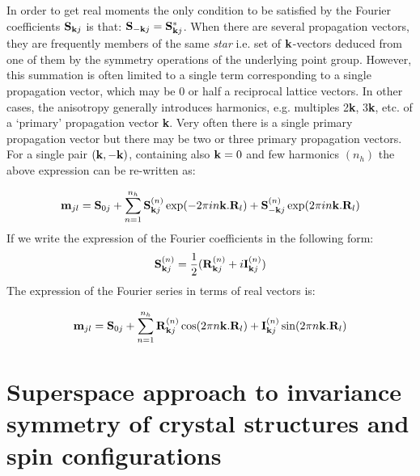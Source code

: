 \documentclass[10pt]{article}
\begin{document}
In order to get real moments the only condition to be satisfied by the Fourier coefficients ${\bf S}_{{\bf k}j}$ is that: ${\bf S}_{-{\bf k}j} = {\bf S}_{{\bf k}j}^*$.
When there are several propagation vectors, they are frequently members of the same {\it star} i.e. set of ${\bf k}$-vectors deduced from one of them by the symmetry operations of the underlying point group. However, this summation is often limited to a single term corresponding to a single propagation vector, which may be 0 or half a reciprocal lattice vectors. In other cases, the anisotropy generally introduces harmonics, e.g. multiples 2{\bf k}, 3{\bf k}, etc. of a `primary' propagation vector  {\bf k}. Very often there is a single primary propagation vector but there may be two or three primary propagation vectors. For a single pair $({\bf k}, -{\bf k})$, containing also $ {\bf k}=0 $ and few harmonics ${(n_h)}$ the above expression can be re-written as:

\begin{equation}
\label{eq_fourier_b}
{\bf m}_{jl} = {\bf S}_{0j} +  \sum\limits_{n=1}^{n_h} {\bf S}_{{\bf k}j}^{(n)} \exp(- 2\pi i n{\bf k}. {\bf R}_l)+ {\bf S}_{-{\bf k}j}^{(n)} \exp(2\pi i n{\bf k}. {\bf R}_l)
\end{equation}
If we write the expression of the Fourier coefficients in the following form:
\begin{equation}
\label{eq_fourier_c}
{\bf S}_{{\bf k}j}^{(n)} = \frac{1}{2}({\bf R}_{{\bf k}j}^{(n)}+ i {\bf I}_{{\bf k}j}^{(n)})
\end{equation}
The expression of the Fourier series in terms of real vectors is:

\begin{equation}
{\bf m}_{jl} = {\bf S}_{0j} +  \sum\limits_{n=1}^{n_h} {\bf R}_{{\bf k}j}^{(n)} \cos( 2\pi n{\bf k}. {\bf R}_l) + {\bf I}_{{\bf k}j}^{(n)} \sin(2\pi n {\bf k}. {\bf R}_l)
\end{equation}


\section{Superspace approach to invariance symmetry of crystal structures and spin configurations}
\label{sec08}
\end{document}
